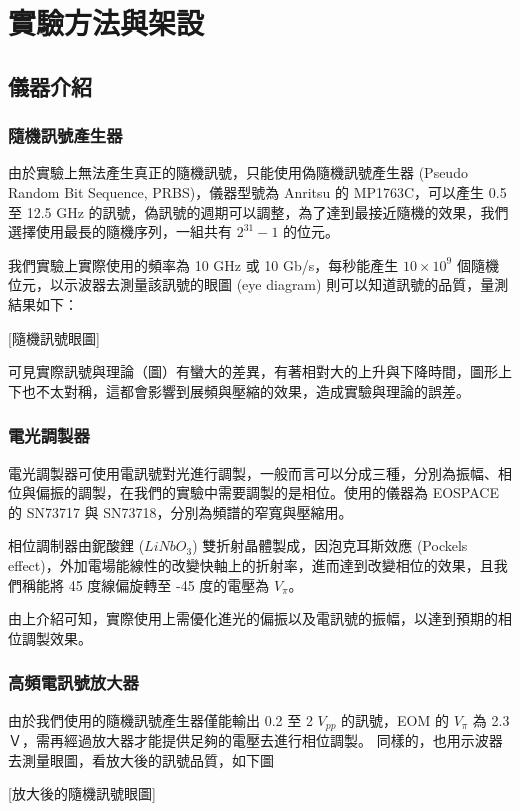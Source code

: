\documentclass[class=NCU_thesis, crop=false]{standalone}
\begin{document}
\chapter{實驗方法與架設}
\section{儀器介紹}
\subsection{隨機訊號產生器}
由於實驗上無法產生真正的隨機訊號，只能使用偽隨機訊號產生器 (Pseudo Random Bit Sequence, PRBS)，儀器型號為 Anritsu 的 MP1763C，可以產生 0.5 至 12.5 GHz 的訊號，偽訊號的週期可以調整，為了達到最接近隨機的效果，我們選擇使用最長的隨機序列，一組共有 $2^{31}-1$ 的位元。

我們實驗上實際使用的頻率為 10 GHz 或 10 Gb/s，每秒能產生 $10\times 10^{9}$ 個隨機位元，以示波器去測量該訊號的眼圖 (eye diagram) 則可以知道訊號的品質，量測結果如下：

[隨機訊號眼圖]

可見實際訊號與理論（圖）有蠻大的差異，有著相對大的上升與下降時間，圖形上下也不太對稱，這都會影響到展頻與壓縮的效果，造成實驗與理論的誤差。

\subsection{電光調製器}
電光調製器可使用電訊號對光進行調製，一般而言可以分成三種，分別為振幅、相位與偏振的調製，在我們的實驗中需要調製的是相位。使用的儀器為 EOSPACE 的 SN73717 與 SN73718，分別為頻譜的窄寬與壓縮用。

相位調制器由鈮酸鋰 ($LiNbO_{3}$) 雙折射晶體製成，因泡克耳斯效應 (Pockels effect)，外加電場能線性的改變快軸上的折射率，進而達到改變相位的效果，且我們稱能將 45 度線偏旋轉至 -45 度的電壓為 $V_{\pi}$。

由上介紹可知，實際使用上需優化進光的偏振以及電訊號的振幅，以達到預期的相位調製效果。

\subsection{高頻電訊號放大器}
由於我們使用的隨機訊號產生器僅能輸出 0.2 至 2 $V_{pp}$ 的訊號，EOM 的 $V_{\pi}$ 為 2.3 Ｖ，需再經過放大器才能提供足夠的電壓去進行相位調製。
同樣的，也用示波器去測量眼圖，看放大後的訊號品質，如下圖

[放大後的隨機訊號眼圖]
\end{document}
